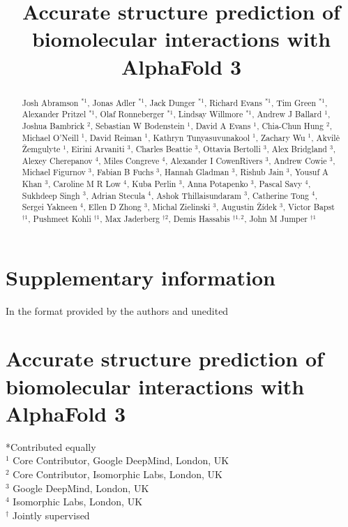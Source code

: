 \documentclass[10pt]{article}
\title{Accurate structure prediction of biomolecular interactions with AlphaFold 3 }
\author{}
\date{}
\begin{document}
\maketitle
\captionsetup{singlelinecheck=false}
\section*{Supplementary information}
In the format provided by the authors and unedited

\section*{Accurate structure prediction of biomolecular interactions with AlphaFold 3 }
\begin{abstract}
Josh Abramson ${ }^{* 1}$, Jonas Adler ${ }^{* 1}$, Jack Dunger ${ }^{* 1}$, Richard Evans ${ }^{* 1}$, Tim Green ${ }^{* 1}$, Alexander Pritzel ${ }^{* 1}$, Olaf Ronneberger ${ }^{* 1}$, Lindsay Willmore ${ }^{* 1}$, Andrew J Ballard ${ }^{1}$, Joshua Bambrick ${ }^{2}$, Sebastian W Bodenstein ${ }^{1}$, David A Evans ${ }^{1}$, Chia-Chun Hung ${ }^{2}$, Michael O'Neill ${ }^{1}$, David Reiman ${ }^{1}$, Kathryn Tunyasuvunakool ${ }^{1}$, Zachary Wu ${ }^{1}$, Akvilė Žemgulyte ${ }^{1}$, Eirini Arvaniti ${ }^{3}$, Charles Beattie ${ }^{3}$, Ottavia Bertolli ${ }^{3}$, Alex Bridgland ${ }^{3}$, Alexey Cherepanov ${ }^{4}$, Miles Congreve ${ }^{4}$, Alexander I CowenRivers ${ }^{3}$, Andrew Cowie ${ }^{3}$, Michael Figurnov ${ }^{3}$, Fabian B Fuchs ${ }^{3}$, Hannah Gladman ${ }^{3}$, Rishub Jain ${ }^{3}$, Yousuf A Khan ${ }^{3}$, Caroline M R Low ${ }^{4}$, Kuba Perlin ${ }^{3}$, Anna Potapenko ${ }^{3}$, Pascal Savy ${ }^{4}$, Sukhdeep Singh ${ }^{3}$, Adrian Stecula ${ }^{4}$, Ashok Thillaisundaram ${ }^{3}$, Catherine Tong ${ }^{4}$, Sergei Yakneen ${ }^{4}$, Ellen D Zhong ${ }^{3}$, Michal Zielinski ${ }^{3}$, Augustin Žídek ${ }^{3}$, Victor Bapst ${ }^{\dagger 1}$, Pushmeet Kohli ${ }^{\dagger 1}$, Max Jaderberg ${ }^{\dagger 2}$, Demis Hassabis ${ }^{\dagger 1,2}$, John M Jumper ${ }^{\dagger 1}$
\end{abstract}

*Contributed equally\\
${ }^{1}$ Core Contributor, Google DeepMind, London, UK\\
${ }^{2}$ Core Contributor, Isomorphic Labs, London, UK\\
${ }^{3}$ Google DeepMind, London, UK\\
${ }^{4}$ Isomorphic Labs, London, UK\\
${ }^{\dagger}$ Jointly supervised
\end{document}
